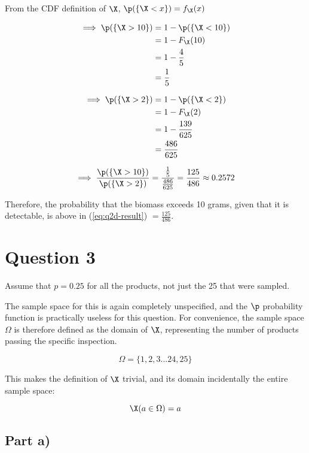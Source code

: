From the CDF definition of $\X$, $\p (\{ \X < x \}) = f_{\X}(x)$

\begin{align*}
\implies \p(\{ \X > 10 \}) &= 1 - \p (\{ \X < 10 \}) \\
&= 1 - F_{\X}(10) \\
&= 1 - \frac{4}{5} \\
&= \frac{1}{5}
\end{align*}

\begin{align*}
\implies \p(\{ \X > 2 \}) &= 1 - \p (\{ \X < 2 \}) \\
&= 1 - F_{\X}(2) \\
&= 1 - \frac{139}{625} \\
&= \frac{486}{625}
\end{align*}

\begin{equation}
\label{eq:q2d-result}
\implies \frac{\p(\{ \X > 10 \})}{\p (\{ \X > 2 \})}
= \frac{\frac{1}{5}}{\frac{486}{625}}
= \frac{125}{486}
\approx 0.2572
\end{equation}

Therefore, the probability that the biomass exceeds 10 grams, given that it is detectable, is above in (\ref{eq:q2d-result}) $ = \frac{125}{486}$.

\newpage

\section*{Question 3}

Assume that $p = 0.25$ for all the products, not just the 25 that were sampled.

The sample space for this is again completely unspecified, and the $\p$ probability function is practically useless for this question.
For convenience, the sample space $\Omega$ is therefore defined as the domain of $\X$, representing the number of products passing the specific inspection.

\[
\Omega = \{ 1, 2, 3 ... 24, 25 \}
\]

This makes the definition of $\X$ trivial, and its domain incidentally the entire sample space:

\[
\X(a \in \Omega) = a
\]


\subsection*{Part a)}

